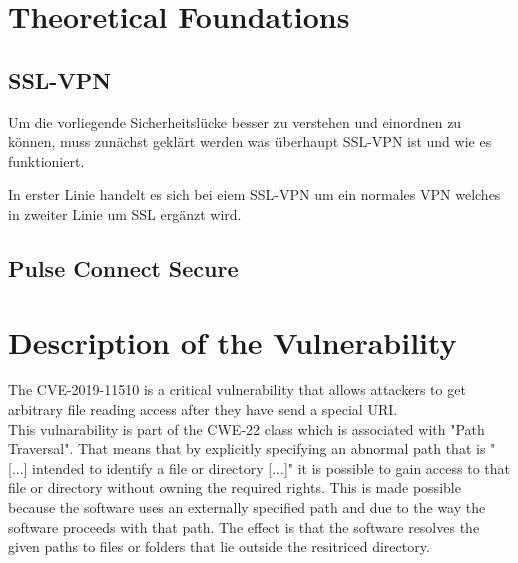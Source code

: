 

\section{Theoretical Foundations}

\subsection{SSL-VPN}

Um die vorliegende Sicherheitslücke besser zu verstehen und einordnen zu können, muss zunächst geklärt werden was überhaupt SSL-VPN ist und wie es funktioniert. 

In erster Linie handelt es sich bei eiem SSL-VPN um ein normales VPN welches in zweiter Linie um SSL ergänzt wird. 

\subsection{Pulse Connect Secure}

\section{Description of the Vulnerability}
\label{sec:description}
The CVE-2019-11510 is a critical vulnerability that allows attackers to get arbitrary file reading access after they have send a special URI.\autocite{NVDCVE:online}\\
This vulnarability is part of the CWE-22 class which is associated with "Path Traversal". That means that by explicitly specifying an abnormal path that is "[...] intended to identify a file or directory [...]" \autocite{CWE22-Definition:online} it is possible to gain access to that file or directory without owning the required rights. This is made possible because the software uses an externally specified path and due to the way the software proceeds with that path. The effect is that the software resolves the given paths to files or folders that lie outside the resitriced directory.\autocite{CWE22-Definition:online}

